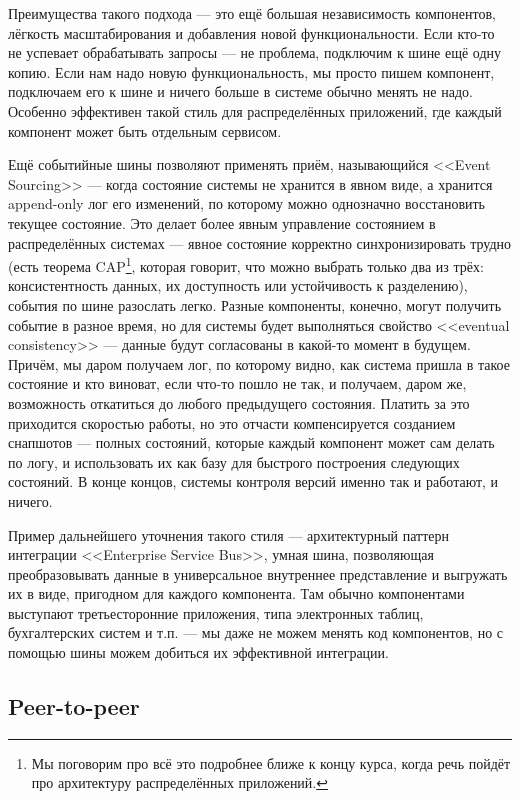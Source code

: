 \documentclass{../../text-style}
\begin{document}
Преимущества такого подхода --- это ещё большая независимость компонентов, лёгкость масштабирования и добавления новой функциональности. Если кто-то не успевает обрабатывать запросы --- не проблема, подключим к шине ещё одну копию. Если нам надо новую функциональность, мы просто пишем компонент, подключаем его к шине и ничего больше в системе обычно менять не надо. Особенно эффективен такой стиль для распределённых приложений, где каждый компонент может быть отдельным сервисом. 

Ещё событийные шины позволяют применять приём, называющийся <<Event Sourcing>> --- когда состояние системы не хранится в явном виде, а хранится append-only лог его изменений, по которому можно однозначно восстановить текущее состояние. Это делает более явным управление состоянием в распределённых системах --- явное состояние корректно синхронизировать трудно (есть теорема CAP\footnote{Мы поговорим про всё это подробнее ближе к концу курса, когда речь пойдёт про архитектуру распределённых приложений.}, которая говорит, что можно выбрать только два из трёх: консистентность данных, их доступность или устойчивость к разделению), события по шине разослать легко. Разные компоненты, конечно, могут получить событие в разное время, но для системы будет выполняться свойство <<eventual consistency>> --- данные будут согласованы в какой-то момент в будущем. Причём, мы даром получаем лог, по которому видно, как система пришла в такое состояние и кто виноват, если что-то пошло не так, и получаем, даром же, возможность откатиться до любого предыдущего состояния. Платить за это приходится скоростью работы, но это отчасти компенсируется созданием снапшотов --- полных состояний, которые каждый компонент может сам делать по логу, и использовать их как базу для быстрого построения следующих состояний. В конце концов, системы контроля версий именно так и работают, и ничего.

Пример дальнейшего уточнения такого стиля --- архитектурный паттерн интеграции <<Enterprise Service Bus>>, умная шина, позволяющая преобразовывать данные в универсальное внутреннее представление и выгружать их в виде, пригодном для каждого компонента. Там обычно компонентами выступают третьесторонние приложения, типа электронных таблиц, бухгалтерских систем и т.п. --- мы даже не можем менять код компонентов, но с помощью шины можем добиться их эффективной интеграции.

\subsection{Peer-to-peer}
\end{document}
